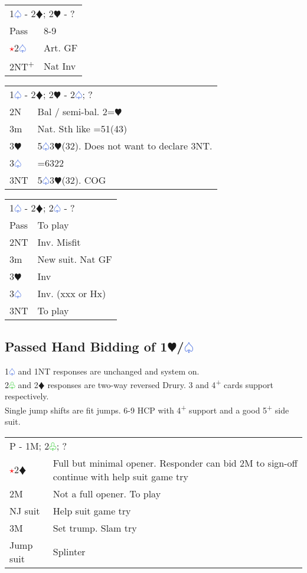 \documentclass{article}
\renewcommand{\sp}{\textcolor{RoyalBlue}{$\varspade$}}
\newcommand{\he}{\textcolor{RubineRed}{$\varheart$}}
\newcommand{\di}{\textcolor{Peach}{$\vardiamond$}}
\newcommand{\cl}{\textcolor{LimeGreen}{$\varclub$}}
\newcommand{\nt}{\relsize{-1}NT\relsize{1}}
\newcommand{\up}{\textsuperscript{+}}
\newcommand{\al}{\textcolor{red}{$\star$}}
\begin{document}
\medskip

\begin{tabular}{|l|p{6.5cm}}
	\multicolumn{2}{l}{1\sp{} - 2\di{}; 2\he{} - ? }\\
	Pass & 8-9 \\
	\al{}2\sp{} & Art. GF \\
	2\nt{}\up{} & Nat Inv \\
\end{tabular}

\medskip

\begin{tabular}{|l|p{6.5cm}}
	\multicolumn{2}{l}{1\sp{} - 2\di{}; 2\he{} - 2\sp{}; ? }\\
	2N & Bal / semi-bal. 2=\he{} \\
	3m & Nat. Sth like =51(43) \\
	3\he{} & 5\sp{}3\he{}(32). Does not want to declare 3\nt{}. \\
	3\sp{} & =6322 \\
	3\nt{} & 5\sp{}3\he{}(32). COG \\
\end{tabular}

\medskip

\begin{tabular}{|l|p{6.5cm}}
	\multicolumn{2}{l}{1\sp{} - 2\di{}; 2\sp{} - ? }\\
	Pass & To play \\
	2\nt{} & Inv. Misfit \\
	3m & New suit. Nat GF \\
	3\he{} & Inv \\
	3\sp{} & Inv. (xxx or Hx) \\
	3\nt{} & To play \\
\end{tabular}


\subsection{Passed Hand Bidding of 1\he{}/\sp}
1\sp{} and 1\nt{} responses are unchanged and system on. \\

2\cl{} and 2\di{} responses are two-way reversed Drury. 3 and 4\up{} cards support respectively. \\

Single jump shifts are fit jumps. 6-9 HCP with 4\up{} support and a good 5\up{} side suit. \\

\begin{tabular}{|l|p{6.5cm}}
	\multicolumn{2}{l}{P - 1M; 2\cl{}; ?}\\
	\al{}2\di{} & Full but minimal opener. Responder can bid 2M to sign-off continue with help suit game try \\
	2M & Not a full opener. To play \\
	NJ suit & Help suit game try \\
	3M & Set trump. Slam try \\
	Jump suit & Splinter \\
\end{tabular}
\end{document}
